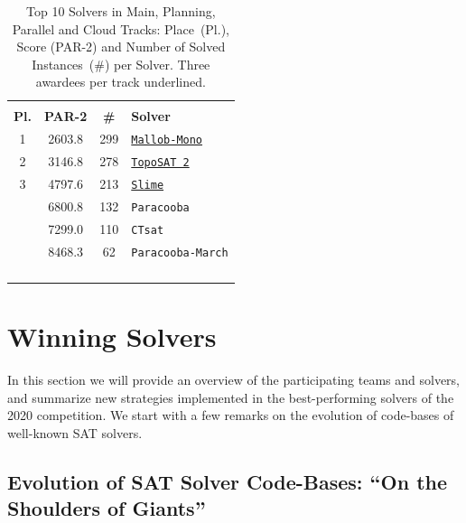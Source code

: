 \documentclass{elsarticle}
\newcommand{\solver}[1]{\texttt{#1}}
\newcommand{\solbert}[1]{\underline{\solver{#1}}}
\begin{document}
\begin{table}
\begin{tabularx}{.5\linewidth}{cccX}
\arrayrulecolor{lightgray}
\multicolumn{4}{l}{\bf Cloud Track}\\
\bf Pl. & \bf PAR-2 & \bf \# & \bf Solver \\
\hline
 1 & 2603.8 & 299 & \solbert{Mallob-Mono} \\
 2 & 3146.8 & 278 & \solbert{TopoSAT 2} \\
 3 & 4797.6 & 213 & \solbert{Slime} \\
   & 6800.8 & 132 & \solver{Paracooba} \\
   & 7299.0 & 110 & \solver{CTsat} \\
   & 8468.3 & \phantom{0}62 & \solver{Paracooba-March} \\
\phantom{0} & \phantom{0} & \phantom{0} & \phantom{0}\\
\phantom{0} & \phantom{0} & \phantom{0} & \phantom{0}\\
\phantom{0} & \phantom{0} & \phantom{0} & \phantom{0}\\
\phantom{0} & \phantom{0} & \phantom{0} & \phantom{0}
\end{tabularx}
\caption{Top 10 Solvers in Main, Planning, Parallel and Cloud Tracks: Place~(Pl.), Score (PAR-2) and Number of Solved Instances~(\#) per Solver.
Three awardees per track underlined.}
\label{tab:results}
\end{table}


\section{Winning Solvers}
\label{sec:winners}

In this section we will provide an overview of the participating teams and solvers, 
and summarize new strategies implemented in the best-performing solvers of the 2020 competition. 
We start with a few remarks on the evolution of code-bases of well-known SAT solvers. %


\subsection{Evolution of SAT Solver Code-Bases: ``On the Shoulders of Giants''}
\label{sec:codebases}
\end{document}
